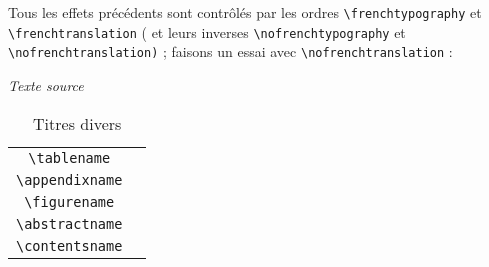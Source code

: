 \documentclass[a4paper,12pt,openright]{article}
\begin{document}
\pagebreak
Tous les effets précédents sont contrôlés par les ordres 
\texttt{{\backslash}frenchtypography} 
et \texttt{{\backslash}frenchtrans\-lation} 
( et leurs inverses \texttt{{\backslash}nofrenchtypography}
et \texttt{{\backslash}nofrench\-translation)} ; 
faisons un essai avec \texttt{{\backslash}nofrenchtranslation} :
\begin{center} %
\begin{minipage}{\textwidth}
\begin{center} %
\textit{Texte source}\\
\begin{boxedverbatim}
{\nofrenchtranslation
 \begin{table}
 \caption{Titres divers}\medskip
  \begin{tabular}{|c|c|}
   \hline
    \verb|\tablename|    & \tablename \\
    \verb|\appendixname| & \appendixname \\
    \verb|\figurename|   & \figurename \\
    \verb|\abstractname| & \abstractname \\
    \verb|\contentsname| & \contentsname \\
    \hline
  \end{tabular}
 \end{table}
}
\end{boxedverbatim}
\end{center}
\end{minipage}
\\[.5em]
\setcounter{mpfootnote}{1} %
\renewcommand{\thempfootnote}{\arabic{mpfootnote}}


\end{center}
\end{document}
